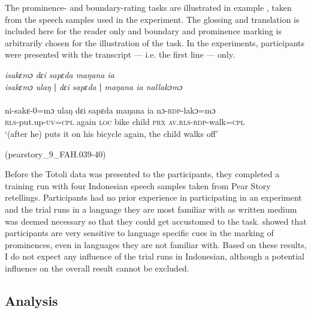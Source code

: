 The prominence- and boundary-rating tasks are illustrated in example  , taken from the speech samples used in the experiment.  The glossing and translation is included here for the reader only and boundary and prominence marking is arbitrarily chosen for the illustration of the task. In the experiments, participants were presented with the transcript --- i.e. the first line --- only.



\ea
\label{ex:isakemo ulang dɛi sapeda}
\textit{isakɛmɔ  dɛi sapɛda maŋana ia  } \\
\textit{isakɛmɔ ulaŋ} \textbf{|} \textit{dɛi sapɛda} \textbf{|} \textit{maŋana ia  nallakɔmɔ} \\ \quad \\
\gll ni-sakɛ-0=mɔ ulaŋ dɛi sapɛda maŋana ia nɔ-\textsc{rdp-}lakɔ=mɔ \\
\textsc{rls}-put.up-\textsc{uv}=\textsc{cpl} again \textsc{loc} bike child \textsc{prx} \textsc{av.rls}-\textsc{rdp}-walk\textsc{=cpl} \\
\glt `(after he) puts it on his bicycle again, the child walks off'
\begin{flushright}(pearstory\_9\_FAH.039-40)
	\end{flushright}
\z





Before the Totoli data was presented to the participants, they completed a training run with four  Indonesian speech samples taken from Pear Story  retellings. Participants had no prior experience in participating in an experiment and the trial runs in a language they are most familiar with as written medium was deemed necessary so that they could get accustomed to the task.  \citet{riesberg2020} showed that participants are very sensitive to language specific cues in the marking of prominences, even in languages they are not familiar with. Based on these results, I do not expect any influence of the trial runs in Indonesian, although a potential influence on the overall result cannot be excluded. 

\subsection{Analysis}
\label{Analysis}

